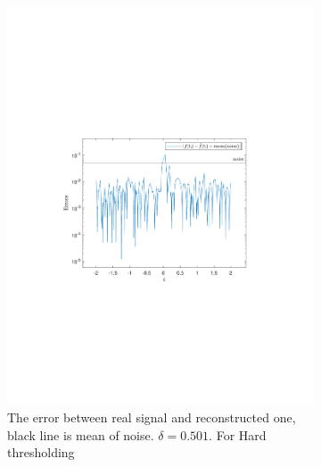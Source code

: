 \documentclass[a4paper]{article}
\begin{document}
    \begin{figure}[H]
	\begin{subfigure}{0.49\textwidth}
	\centering
\includegraphics[trim={3.5cm 8cm 4cm 9cm},clip,width=1\textwidth]{Images/DeltaOpti.pdf}
\caption{The error between real signal and reconstructed one, black line is mean of noise. $\delta = 0.501$. For Hard thresholding}
\label{sub:BestDelta}
\end{subfigure}
\begin{subfigure}{0.49\textwidth}
	\centering

\end{subfigure}
\end{figure}
\end{document}
